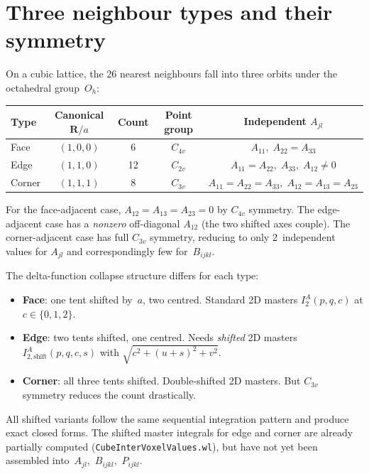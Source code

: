 \documentclass[11pt,a4paper]{article}
\newcommand{\bR}{\bm{R}}
\theoremstyle{plain}
\theoremstyle{remark}
\begin{document}
\section{Three neighbour types and their symmetry}
\label{sec:neighbours}

On a cubic lattice, the 26 nearest neighbours fall into three
orbits under the octahedral group~$O_h$:
\begin{center}
\begin{tabular}{lcccc}
\toprule
Type & Canonical $\bR/a$ & Count & Point group & Independent $A_{jl}$ \\
\midrule
Face   & $(1,0,0)$ & 6  & $C_{4v}$ & $A_{11},\; A_{22}=A_{33}$ \\
Edge   & $(1,1,0)$ & 12 & $C_{2v}$ & $A_{11}=A_{22},\; A_{33},\; A_{12}\neq 0$ \\
Corner & $(1,1,1)$ & 8  & $C_{3v}$ & $A_{11}=A_{22}=A_{33},\; A_{12}=A_{13}=A_{23}$ \\
\bottomrule
\end{tabular}
\end{center}

For the face-adjacent case, $A_{12}=A_{13}=A_{23}=0$ by $C_{4v}$
symmetry.  The edge-adjacent case has a \emph{nonzero} off-diagonal
$A_{12}$ (the two shifted axes couple).  The corner-adjacent case has
full $C_{3v}$ symmetry, reducing to only 2~independent values for
$A_{jl}$ and correspondingly few for~$B_{ijkl}$.

The delta-function collapse structure differs for each type:
\begin{itemize}[nosep]
  \item \textbf{Face}: one tent shifted by~$a$, two centred.
    Standard 2D masters $I^A_2(p,q,c)$ at $c\in\{0,1,2\}$.
  \item \textbf{Edge}: two tents shifted, one centred.
    Needs \emph{shifted} 2D masters
    $I^A_{2,\mathrm{shift}}(p,q,c,s)$ with $\sqrt{c^2+(u+s)^2+v^2}$.
  \item \textbf{Corner}: all three tents shifted.
    Double-shifted 2D masters.  But $C_{3v}$ symmetry reduces the
    count drastically.
\end{itemize}

All shifted variants follow the same sequential integration pattern
and produce exact closed forms.  The shifted master integrals for
edge and corner are already partially computed
(\texttt{CubeInterVoxelValues.wl}), but have not yet been assembled
into~$A_{jl}$,~$B_{ijkl}$,~$P_{ijkl}$.
\end{document}
